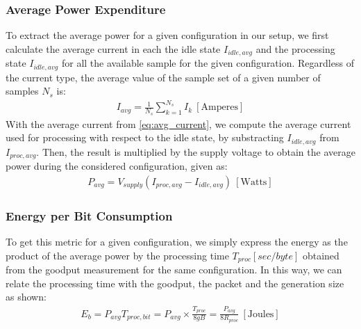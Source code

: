 \subsubsection{Average Power Expenditure}
To extract the average power for a given configuration in our setup, we
first calculate the average current in each the idle state $I_{idle,avg}$
and the processing state $I_{idle,avg}$ for all the available sample for
the given configuration. Regardless of the current type, the average value
of the sample set of a given number of samples $N_s$ is:
%
\begin{align} \label{eq:avg_current}
I_{avg} = \frac{1}{N_s}\sum_{k=1}^{N_s} I_{k}  ~[\mathrm{Amperes}]
\end{align}
%
With the average current from \eqref{eq:avg_current}, we compute the average
current used for processing with respect to the idle state, by substracting
$I_{idle,avg}$ from $I_{proc,avg}$. Then, the result is multiplied by the
supply voltage to obtain the average power during the considered configuration,
given as:
%
\begin{align} \label{eq:avg_power}
P_{avg} = V_{supply}(I_{proc,avg} - I_{idle,avg}) ~[\mathrm{Watts}]
\end{align}
%
\subsubsection{Energy per Bit Consumption}
To get this metric for a given configuration, we simply express the energy
as the product of the average power by the processing time $T_{proc} [sec/byte]$
obtained from the goodput measurement for the same configuration. In this way, we can
relate the processing time with the goodput, the packet and the generation size
as shown:
%
\begin{align} \label{eq:energy_per_bit}
E_b = P_{avg} T_{proc,bit} = P_{avg} \times \frac{T_{proc}}{8gB} = \frac{P_{avg}}{8R_{proc}} ~[\mathrm{Joules}]
\end{align}
%
